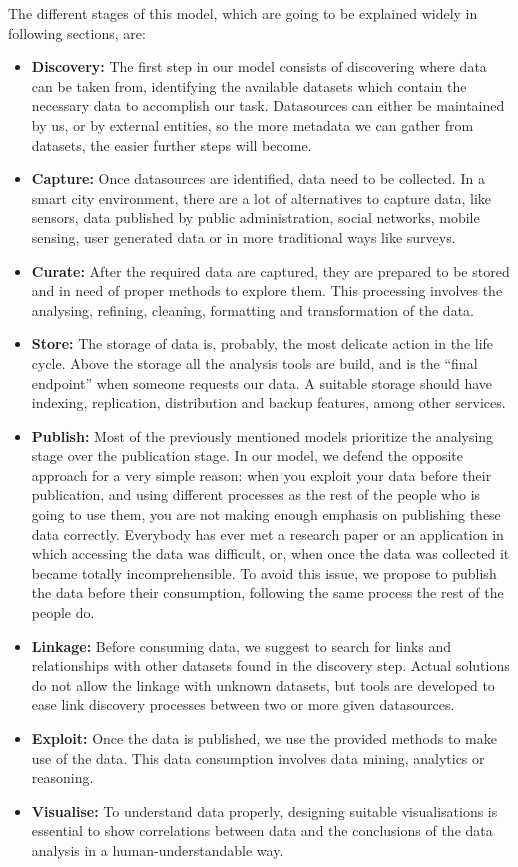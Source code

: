 The different stages of this model, which are going to be explained widely in following sections, are:
\begin{itemize}
	\item \textbf{Discovery:} The first step in our model consists of discovering where data can be taken from, identifying the available datasets which contain the necessary data to accomplish our task. Datasources can either be maintained by us, or by external entities, so the more metadata we can gather from datasets, the easier further steps will become.
    \item \textbf{Capture:} Once datasources are identified, data need to be collected. In a smart city environment, there are a lot of alternatives to capture data, like sensors, data published by public administration, social networks, mobile sensing, user generated data or in more traditional ways like surveys.
    \item \textbf{Curate:} After the required data are captured, they are prepared to be stored and in need of proper methods to explore them. This processing involves the analysing, refining, cleaning, formatting and transformation of the data.
    \item \textbf{Store:} The storage of data is, probably, the most delicate action in the life cycle. Above the storage  all the analysis tools are build, and is the ``final endpoint'' when someone requests our data. A suitable storage should have indexing, replication, distribution and backup features, among other services.
    \item \textbf{Publish:} Most of the previously mentioned models prioritize the analysing stage over the publication stage. In our model, we defend the opposite approach for a very simple reason: when you exploit your data before their publication, and using different processes as the rest of the people who is going to use them, you are not making enough emphasis on publishing these data correctly. Everybody has ever met a research paper or an application in which accessing the data was difficult, or, when once the data was collected it became totally incomprehensible. To avoid this issue, we propose to publish the data before their consumption, following the same process the rest of the people do.
    \item \textbf{Linkage:} Before consuming data, we suggest to search for links and relationships with other datasets found in the discovery step. Actual solutions do not allow the linkage with unknown datasets, but tools are developed to ease link discovery processes between two or more given datasources.
    \item \textbf{Exploit:} Once the data is published, we use the provided methods to make use of the data. This data consumption involves data mining, analytics or reasoning.
    \item \textbf{Visualise:} To understand data properly, designing suitable visualisations is essential to show correlations between data and the conclusions of the data analysis in a human-understandable way.

\end{itemize}

